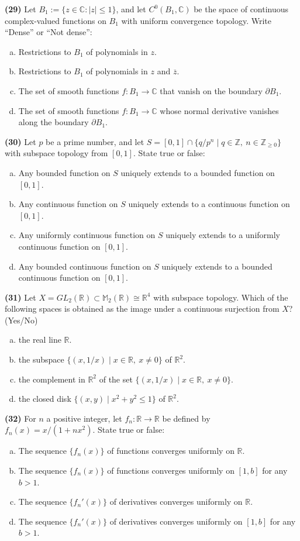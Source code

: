 \documentclass[11pt,a4paper]{article}
\newcommand{\Z}{\mathbb{Z}}
\newcommand{\R}{\mathbb{R}}
\newcommand{\C}{\mathbb{C}}
\newcommand{\M}{\mathbb{M}}
\newcommand{\qitem}[1]{\par\medskip\noindent\textbf{#1}\hspace{0.5em}}
\begin{document}
\qitem{(29)} Let $B_1 := \{z \in \C : |z| \le 1\}$, and let $C^0(B_1, \C)$ be the space of continuous complex-valued functions on $B_1$ with uniform convergence topology. Write ``Dense'' or ``Not dense'':
\begin{enumerate}[(a)]
  \item Restrictions to $B_1$ of polynomials in $z$.
  \item Restrictions to $B_1$ of polynomials in $z$ and $\overline{z}$.
  \item The set of smooth functions $f : B_1 \to \C$ that vanish on the boundary $\partial B_1$.
  \item The set of smooth functions $f : B_1 \to \C$ whose normal derivative vanishes along the boundary $\partial B_1$.
\end{enumerate}

\qitem{(30)} Let $p$ be a prime number, and let $S = [0, 1] \cap \{q/p^n \mid q \in \Z,\ n \in \Z_{\ge 0}\}$ with subspace topology from $[0, 1]$. State true or false:
\begin{enumerate}[(a)]
  \item Any bounded function on $S$ uniquely extends to a bounded function on $[0, 1]$.
  \item Any continuous function on $S$ uniquely extends to a continuous function on $[0, 1]$.
  \item Any uniformly continuous function on $S$ uniquely extends to a uniformly continuous function on $[0, 1]$.
  \item Any bounded continuous function on $S$ uniquely extends to a bounded continuous function on $[0, 1]$.
\end{enumerate}

\qitem{(31)} Let $X = GL_2(\R) \subset \M_2(\R) \cong \R^4$ with subspace topology. Which of the following spaces is obtained as the image under a continuous surjection from $X$? (Yes/No)
\begin{enumerate}[(a)]
  \item the real line $\R$.
  \item the subspace $\{(x, 1/x) \mid x \in \R,\ x \neq 0\}$ of $\R^2$.
  \item the complement in $\R^2$ of the set $\{(x, 1/x) \mid x \in \R,\ x \neq 0\}$.
  \item the closed disk $\{(x, y) \mid x^2 + y^2 \le 1\}$ of $\R^2$.
\end{enumerate}

\qitem{(32)} For $n$ a positive integer, let $f_n : \R \to \R$ be defined by $f_n(x) = x/(1 + nx^2)$. State true or false:
\begin{enumerate}[(a)]
  \item The sequence $\{f_n(x)\}$ of functions converges uniformly on $\R$.
  \item The sequence $\{f_n(x)\}$ of functions converges uniformly on $[1, b]$ for any $b > 1$.
  \item The sequence $\{f_n'(x)\}$ of derivatives converges uniformly on $\R$.
  \item The sequence $\{f_n'(x)\}$ of derivatives converges uniformly on $[1, b]$ for any $b > 1$.
\end{enumerate}
\end{document}
